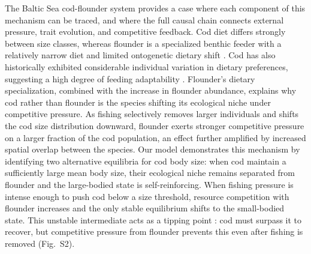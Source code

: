 \documentclass[12pt]{article}
\begin{document}
The Baltic Sea cod-flounder system provides a case where each component of this mechanism can be traced, and where the full causal chain connects external pressure, trait evolution, and competitive feedback. Cod diet differs strongly between size classes, whereas flounder is a specialized benthic feeder with a relatively narrow diet and limited ontogenetic dietary shift \citep{Haase2020}. Cod has also historically exhibited considerable individual variation in dietary preferences, suggesting a high degree of feeding adaptability \citep{Haase2020}. Flounder's dietary specialization, combined with the increase in flounder abundance, explains why cod rather than flounder is the species shifting its ecological niche under competitive pressure. As fishing selectively removes larger individuals and shifts the cod size distribution downward, flounder exerts stronger competitive pressure on a larger fraction of the cod population, an effect further amplified by increased spatial overlap between the species. Our model demonstrates this mechanism by identifying two alternative equilibria for cod body size: when cod maintain a sufficiently large mean body size, their ecological niche remains separated from flounder and the large-bodied state is self-reinforcing. When fishing pressure is intense enough to push cod below a size threshold, resource competition with flounder increases and the only stable equilibrium shifts to the small-bodied state. This unstable intermediate acts as a tipping point \citep{Dakos2022}: cod must surpass it to recover, but competitive pressure from flounder prevents this even after fishing is removed (Fig.~S2).
\end{document}
